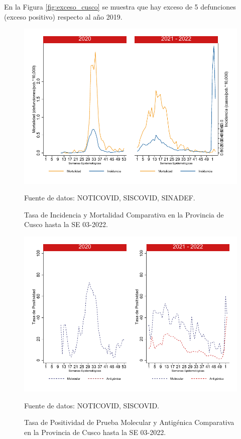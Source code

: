 \documentclass[12pt,a4paper,openany]{book}
\begin{document}
	En la Figura \ref{fig:exceso_cusco} se muestra que hay exceso de 5 defunciones (exceso positivo) respecto al año 2019.
		
		\begin{figure}[h]
			\caption{Tasa de Incidencia y Mortalidad Comparativa en la Provincia de Cusco hasta la SE 03-2022.}\label{fig:inc_mort_cusco}
			\begin{center}
				\includegraphics[width=0.7\linewidth]{../figuras/incidencia_mortalidad_20_21_7}
			\end{center}
			{\footnotesize {Fuente de datos: NOTICOVID, SISCOVID, SINADEF.}}
		\end{figure}
		
		\begin{figure}[h]
			\caption{Tasa de Positividad de Prueba Molecular y Antigénica Comparativa en la Provincia de Cusco hasta la SE 03-2022.}\label{fig:positividad_cusco}
			\begin{center}
				\includegraphics[width=0.7\linewidth]{../figuras/positividad_20_21_7}
			\end{center}
			{\footnotesize {Fuente de datos: NOTICOVID, SISCOVID.}}
		\end{figure}
		
\end{document}

